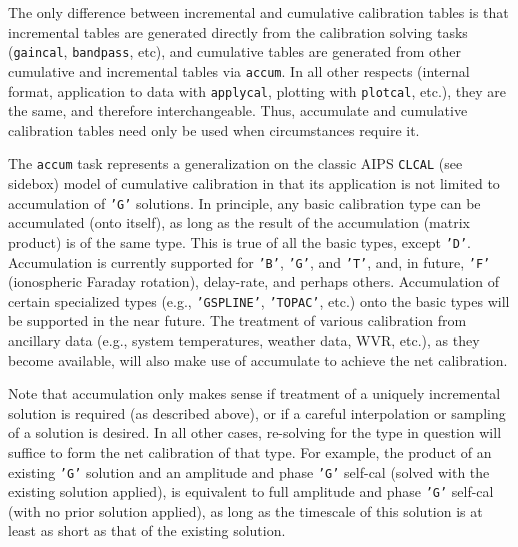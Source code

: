The only difference between incremental and cumulative calibration
tables is that incremental tables are generated directly from the
calibration solving tasks ({\tt gaincal}, {\tt bandpass}, etc), and
cumulative tables are generated from other cumulative and incremental
tables via {\tt accum}. In all other respects (internal format,
application to data with {\tt applycal}, plotting with {\tt plotcal},
etc.), they are the same, and therefore interchangeable. Thus,
accumulate and cumulative calibration tables need only be used when
circumstances require it.

The {\tt accum} task represents a generalization on the classic AIPS
{\tt CLCAL} (see sidebox) model of cumulative calibration in that its
application is not limited to accumulation of {\tt 'G'} solutions. 
In principle, any
basic calibration type can be accumulated (onto itself), as long as the
result of the accumulation (matrix product) is of the same type. This is
true of all the basic types, except {\tt 'D'}. Accumulation is currently
supported for {\tt 'B'}, {\tt 'G'}, and {\tt 'T'}, and, in future,
{\tt 'F'} (ionospheric Faraday rotation), delay-rate, and perhaps
others. Accumulation of certain specialized
types (e.g., {\tt 'GSPLINE'}, {\tt 'TOPAC'}, etc.) onto the basic types will be
supported in the near future. The treatment of various calibration from
ancillary data (e.g., system temperatures, weather data, WVR, etc.), as
they become available, will also make use of accumulate to achieve the net
calibration.

Note that accumulation only makes sense if treatment of a uniquely
incremental solution is required (as described above), or if a careful
interpolation or sampling of a solution is desired. In all other cases,
re-solving for the type in question will suffice to form the net
calibration of that type. For example, the product of an existing {\tt 'G'}
solution and an amplitude and phase {\tt 'G'} self-cal (solved with the
existing solution applied), is equivalent to full amplitude and phase
{\tt 'G'} self-cal (with no prior solution applied), as long as the timescale
of this solution is at least as short as that of the existing solution.

